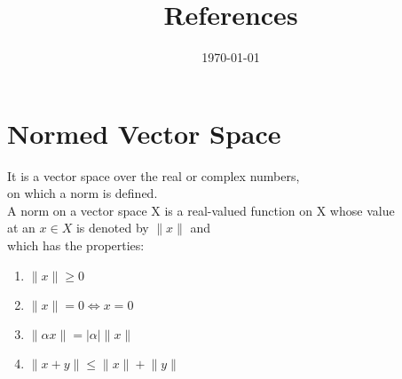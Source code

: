 \documentclass[11pt]{article}
\date{\today}
\title{References}
\newcommand{\norm}[1]{\lVert#1\rVert}
\newcommand{\abs}[1]{\lvert#1\rvert}
\begin{document}
\maketitle

\section{Normed Vector Space}
\label{sec:org04661cb}
It is a vector space over the real or complex numbers,\\
on which a norm is defined.\\
A norm on a vector space X is a real-valued function on X whose value\\
at an \(x \in X\) is denoted by \(\norm{x}\) and\\
which has the properties:\\
\begin{enumerate}

  \item $ \norm{x} \geq 0                         $
  \item $ \norm{x} = 0 \Longleftrightarrow x = 0  $
  \item $ \norm{\alpha x}  = \abs \alpha  \norm{x}$
  \item $ \norm{x + y}  \leq \norm{x}  + \norm{y} $
\end{enumerate}
\end{document}
